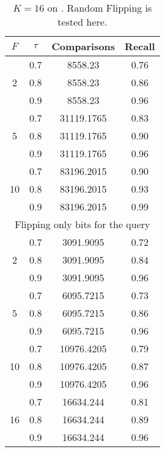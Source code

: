 \documentclass[11pt]{article}
\begin{document}
\begin{table}
\centering
\begin{tabular}{|c|c|c|c|}
\hline
$F$ & $\tau$ & Comparisons & Recall \\ 
\hline
\multirow{3}{*}{2} & 0.7 & 8558.23 & 0.76 \\
 & 0.8 & 8558.23 & 0.86 \\
 & 0.9 & 8558.23 & 0.96 \\
\hline 
\multirow{3}{*}{5} & 0.7 & 31119.1765 & 0.83 \\
 & 0.8 & 31119.1765 & 0.90 \\
 & 0.9 & 31119.1765 & 0.96 \\
\hline 
\multirow{3}{*}{10} & 0.7 & 83196.2015 & 0.90 \\
 & 0.8 & 83196.2015 & 0.93 \\
 & 0.9 & 83196.2015 & 0.99 \\
\hline
\multicolumn{4}{c}{Flipping only bits for the query} \\
\multirow{3}{*}{2} & 0.7 & 3091.9095 & 0.72 \\
& 0.8 & 3091.9095 & 0.84 \\
 & 0.9 & 3091.9095 & 0.96 \\
\multirow{3}{*}{5} & 0.7 & 6095.7215 & 0.73 \\
 & 0.8 & 6095.7215 & 0.86 \\
 & 0.9 & 6095.7215 & 0.96 \\
\multirow{3}{*}{10} & 0.7 & 10976.4205 & 0.79 \\
 & 0.8 & 10976.4205 & 0.87 \\
 & 0.9 & 10976.4205 & 0.96 \\
\multirow{3}{*}{16} & 0.7 & 16634.244 & 0.81 \\
 & 0.8 & 16634.244 & 0.89 \\
 & 0.9 & 16634.244 & 0.96 \\

 \end{tabular}
\caption{\footnotesize{$K=16$ on \dataA. Random Flipping is tested here.}}
\label{tab:data-so}
\end{table}
\end{document}
